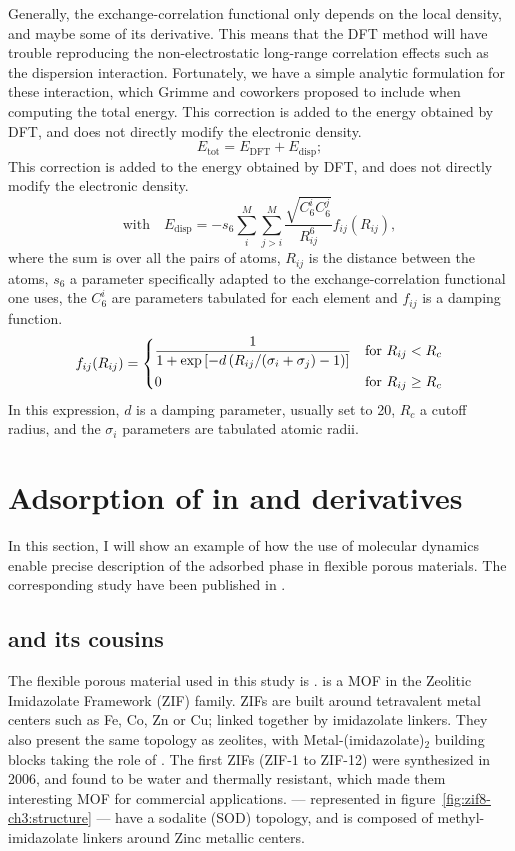 \documentclass[thesis]{subfiles}
\begin{document}
Generally, the exchange-correlation functional only depends on the local
density, and maybe some of its derivative. This means that the DFT method will
have trouble reproducing the non-electrostatic long-range correlation effects
such as the dispersion interaction. Fortunately, we have a simple analytic
formulation for these interaction, which Grimme and coworkers\cite{Grimme2006}
proposed to include when computing the total energy. This correction is added to
the energy obtained by DFT, and does not directly modify the electronic density.
\[E_\text{tot} = E_\text{DFT} + E_\text{disp}; \]
This correction is added to the energy obtained by DFT, and does not directly
modify the electronic density.
\[\text{with}\quad E_\text{disp} = - s_6 \sum_i^M\sum_{j>i}^M\frac{\sqrt{C_6^i C_6^j}}{R_{ij}^6} f_{ij}(R_{ij}),\]
where the sum is over all the pairs of atoms, $R_{ij}$ is the distance between
the atoms, $s_6$ a parameter specifically adapted to the exchange-correlation
functional one uses, the $C_6^i$ are parameters tabulated for each element and
$f_{ij}$ is a damping function.
\[f_{ij}(R_{ij}) =
\begin{dcases}
    \frac{1}{1 + \exp\left[-d \left(R_{ij} / (\sigma_i + \sigma_j) -1\right)\right]} &\text{for } R_{ij} < R_c \\
    0 &\text{for } R_{ij} \geq R_c \\
\end{dcases}\]
In this expression, $d$ is a damping parameter, usually set to 20, $R_c$ a
cutoff radius, and the $\sigma_i$ parameters are tabulated atomic \vdW radii.

\section{Adsorption of  in  and derivatives}

In this section, I will show an example of how the use of \abinitio molecular
dynamics enable precise description of the adsorbed phase in flexible porous
materials. The corresponding study have been published in
\cite{Chaplais2018}.

\subsection{ and its cousins}

The flexible porous material used in this study is .  is a MOF in the
Zeolitic Imidazolate Framework (ZIF) family. ZIFs are built around tetravalent
metal centers such as Fe, Co, Zn or Cu; linked together by imidazolate linkers.
They also present the same topology as zeolites, with Metal-(imidazolate)$_2$
building blocks taking the role of . The first ZIFs (ZIF-1 to ZIF-12)
were synthesized in 2006\cite{Park2006}, and found to be water and thermally
resistant, which made them interesting MOF for commercial applications. 
--- represented in figure~\ref{fig:zif8-ch3:structure} --- have a sodalite (SOD)
topology, and is composed of methyl-imidazolate linkers around Zinc metallic
centers.
\end{document}

